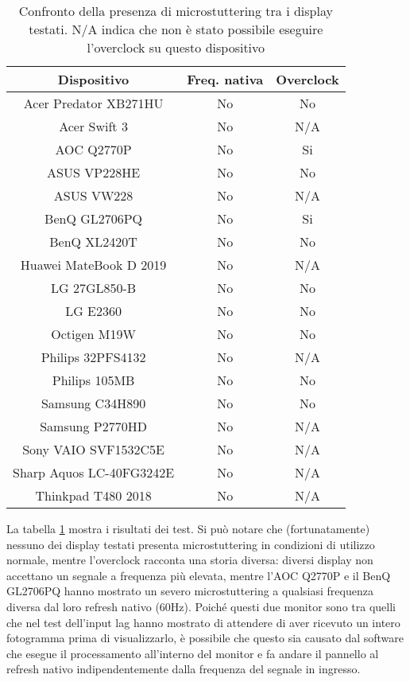 \begin{table}[h!]
	\centering
	\begin{tabular}{|c|c|c|} 
		\hline
		\textbf{Dispositivo} & \textbf{Freq. nativa} & \textbf{Overclock}  \\ 
		\hline
		Acer Predator XB271HU & No & No \\ \hline
		Acer Swift 3 & No & N/A \\ \hline
		AOC Q2770P & No & Si \\ \hline
		ASUS VP228HE & No & No \\ \hline
		ASUS VW228 & No & N/A \\ \hline
		BenQ GL2706PQ & No & Si \\ \hline
		BenQ XL2420T & No & No \\ \hline
		Huawei MateBook D 2019 & No & N/A \\ \hline
		LG 27GL850-B & No & No \\ \hline
		LG E2360 & No & No \\ \hline
		Octigen M19W & No & No \\ \hline
		Philips 32PFS4132 & No & N/A \\ \hline
		Philips 105MB & No & No \\ \hline
		Samsung C34H890 & No & No \\ \hline
		Samsung P2770HD & No & N/A \\ \hline
		Sony VAIO SVF1532C5E & No & N/A \\ \hline
		Sharp Aquos LC-40FG3242E & No & N/A \\ \hline
		Thinkpad T480 2018 & No & N/A \\ \hline
	\end{tabular}
	\caption{\label{tab:microstuttering_list}Confronto della presenza di microstuttering tra i display testati. N/A indica che non è stato possibile eseguire l'overclock su questo dispositivo}
\end{table}

La tabella \ref{tab:microstuttering_list} mostra i risultati dei test. Si può notare che (fortunatamente) nessuno dei display testati presenta microstuttering in condizioni di utilizzo normale, mentre l'overclock racconta una storia diversa: diversi display non accettano un segnale a frequenza più elevata, mentre l'AOC Q2770P e il BenQ GL2706PQ hanno mostrato un severo microstuttering a qualsiasi frequenza diversa dal loro refresh nativo (60Hz). Poiché questi due monitor sono tra quelli che nel test dell'input lag hanno mostrato di attendere di aver ricevuto un intero fotogramma prima di visualizzarlo, è possibile che questo sia causato dal software che esegue il processamento all'interno del monitor e fa andare il pannello al refresh nativo indipendentemente dalla frequenza del segnale in ingresso.


